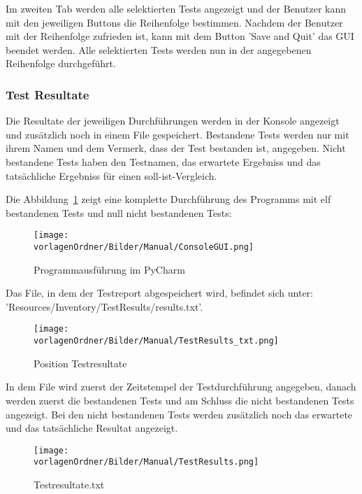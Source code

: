 \documentclass[]{subfiles}
\begin{document}
		Im zweiten Tab werden alle selektierten Tests angezeigt und der Benutzer 
		kann mit den jeweiligen Buttons die Reihenfolge bestimmen.
		Nachdem der Benutzer mit der Reihenfolge zufrieden ist,
		kann mit dem Button 'Save and Quit' das GUI beendet werden.
		Alle selektierten Tests werden nun in der angegebenen Reihenfolge durchgeführt.

	\newpage
		

	\subsubsection{Test Resultate}
		Die Resultate der jeweiligen Durchführungen werden in der Konsole angezeigt 
		und zusätzlich noch in einem File gespeichert.
		Bestandene Tests werden nur mit ihrem Namen und dem Vermerk, dass der Test bestanden ist,
		angegeben. 
		Nicht bestandene Tests haben den Testnamen, das erwartete Ergebniss und das tatsächliche
		Ergebniss für einen soll-ist-Vergleich.

		Die Abbildung~\ref{fig:ChooseTestGui} zeigt eine komplette Durchführung des Programms mit elf bestandenen
		Tests und null nicht bestandenen Tests: 


		\begin{figure}[h!]
			\begin{center}
				\texttt{[image: \\vorlagenOrdner/Bilder/Manual/ConsoleGUI.png]}
				\caption{Programmausführung im PyCharm}
				\label{fig:ChooseTestGui}
			\end{center}
		\end{figure}

		\newpage

		Das File, in dem der Testreport abgespeichert wird, befindet sich unter: 
		'Resources/Inventory/TestResults/results.txt'.

		\begin{figure}[h!]
			\begin{center}
				\texttt{[image: \\vorlagenOrdner/Bilder/Manual/TestResults\_txt.png]}
				\caption{Position Testresultate}
			\end{center}
		\end{figure}

		In dem File wird zuerst der Zeitstempel der Testdurchführung angegeben, 
		danach werden zuerst die bestandenen Tests und am Schluss die nicht bestandenen Tests angezeigt.
		Bei den nicht bestandenen Tests werden zusätzlich noch das erwartete und das tatsächliche
		Resultat angezeigt.

		\begin{figure}[h!]
			\begin{center}
				\texttt{[image: \\vorlagenOrdner/Bilder/Manual/TestResults.png]}
				\caption{Testresultate.txt}
			\end{center}
		\end{figure}
\end{document}
